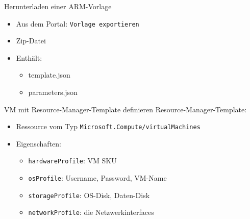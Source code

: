 \begin{flashcard}[Definition]{Herunterladen einer ARM-Vorlage}
    \begin{itemize}
        \item Aus dem Portal:\newline
            \texttt{Vorlage exportieren}
        \item Zip-Datei
        \item Enthält:
            \begin{itemize}
                \item template.json
                \item parameters.json
            \end{itemize}
    \end{itemize}
\end{flashcard}


\begin{flashcard}[Definition]{VM mit Resource-Manager-Template definieren}
    Resource-Manager-Template:
    \begin{itemize}
        \item Ressource vom Typ \texttt{Microsoft.Compute/virtualMachines}
        \item Eigenschaften:
            \begin{itemize}
                \item \texttt{hardwareProfile}: VM SKU
                \item \texttt{osProfile}: Username, Password, VM-Name
                \item \texttt{storageProfile}: OS-Disk, Daten-Disk
                \item \texttt{networkProfile}: die Netzwerkinterfaces
            \end{itemize}

    \end{itemize}
\end{flashcard}

